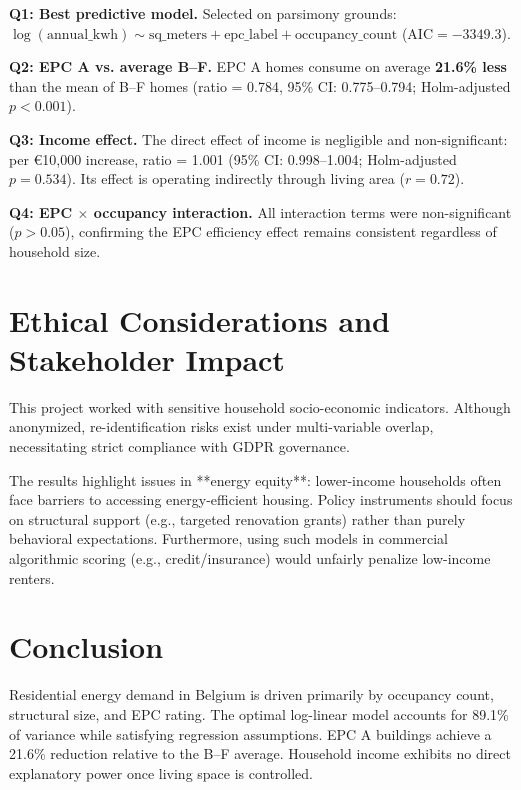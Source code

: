 \documentclass[11pt, a4paper]{article}
\begin{document}
\textbf{Q1: Best predictive model.} Selected on parsimony grounds: $\log(\text{annual\_kwh}) \sim \text{sq\_meters} + \text{epc\_label} + \text{occupancy\_count}$ ($\text{AIC} = -3349.3$).

\textbf{Q2: EPC A vs. average B--F.} EPC A homes consume on average \textbf{21.6\% less} than the mean of B--F homes (ratio = 0.784, 95\% CI: 0.775--0.794; Holm-adjusted $p < 0.001$).

\textbf{Q3: Income effect.} The direct effect of income is negligible and non-significant: per €10,000 increase, ratio = 1.001 (95\% CI: 0.998--1.004; Holm-adjusted $p = 0.534$). Its effect is operating indirectly through living area ($r = 0.72$).

\textbf{Q4: EPC $\times$ occupancy interaction.} All interaction terms were non-significant ($p > 0.05$), confirming the EPC efficiency effect remains consistent regardless of household size.

\section{Ethical Considerations and Stakeholder Impact}\label{sec:ethics}

This project worked with sensitive household socio-economic indicators. Although anonymized, re-identification risks exist under multi-variable overlap, necessitating strict compliance with GDPR governance.

The results highlight issues in **energy equity**: lower-income households often face barriers to accessing energy-efficient housing. Policy instruments should focus on structural support (e.g., targeted renovation grants) rather than purely behavioral expectations. Furthermore, using such models in commercial algorithmic scoring (e.g., credit/insurance) would unfairly penalize low-income renters.

\section{Conclusion}\label{sec:conclusion}

Residential energy demand in Belgium is driven primarily by occupancy count, structural size, and EPC rating. The optimal log-linear model accounts for 89.1\% of variance while satisfying regression assumptions. EPC A buildings achieve a 21.6\% reduction relative to the B--F average. Household income exhibits no direct explanatory power once living space is controlled.
\end{document}
